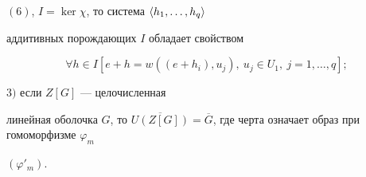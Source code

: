 \begin{thm}
$(6)$, $I=\ker\chi $, то система $\langle h_1,\dotsc,h_q\rangle$


аддитивных порождающих $I$ обладает свойством


$$


\forall h\in I[e+h=w((e+h_i),u_j),\ u_j\in U_1,\ j=1,\dotsc,q];


$$





$3)$ если $Z[G]$ --- целочисленная 


линейная оболочка $G$, то $\overline{U(Z[G])}


=\overline G$, где черта означает образ при гомоморфизме $\varphi_m$ 


$(\varphi '_m)$.


\end{thm}








